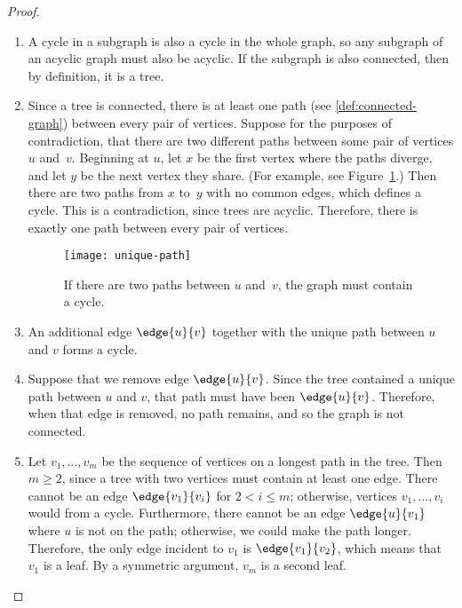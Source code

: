 \begin{proof}
\begin{enumerate}

\item A cycle in a subgraph is also a cycle in the whole graph, so any
  subgraph of an acyclic graph must also be acyclic.  If the subgraph
  is also connected, then by definition, it is a tree.

\item Since a tree is connected, there is at least one path (see
  \ref{def:connected-graph}) between every pair of vertices.  Suppose
  for the purposes of contradiction, that there are two different
  paths between some pair of vertices $u$ and~$v$.  Beginning at $u$,
  let $x$ be the first vertex where the paths diverge, and let $y$ be
  the next vertex they share.  (For example, see Figure~\ref{fig:5L}.)
  Then there are two paths from $x$ to~$y$ with no common edges, which
  defines a cycle.  This is a contradiction, since trees are acyclic.
  Therefore, there is exactly one path between every pair of vertices.

\begin{figure}
\texttt{[image: unique-path]}

\caption{If there are two paths between $u$ and~$v$, the graph must
  contain a cycle.}

\label{fig:5L}
\end{figure}

\item An additional edge $\edge{u}{v}$ together with the unique path
  between $u$ and $v$ forms a cycle.

\item Suppose that we remove edge $\edge{u}{v}$.  Since the tree
  contained a unique path between $u$ and $v$, that path must have
  been $\edge{u}{v}$.  Therefore, when that edge is removed, no path
  remains, and so the graph is not connected.

\item Let $v_1, \dots, v_m$ be the sequence of vertices on a longest
  path in the tree.  Then $m \geq 2$, since a tree with two vertices
  must contain at least one edge.  There cannot be an edge
  $\edge{v_1}{v_i}$ for $2 < i \leq m$; otherwise, vertices $v_1,
  \dots, v_i$ would from a cycle.  Furthermore, there cannot be
  an edge $\edge{u}{v_1}$ where $u$ is not on the path; otherwise, we
  could make the path longer.  Therefore, the only edge incident to
  $v_1$ is $\edge{v_1}{v_2}$, which means that $v_1$ is a leaf.  By a
  symmetric argument, $v_m$ is a second leaf.


\end{enumerate}
\end{proof}
